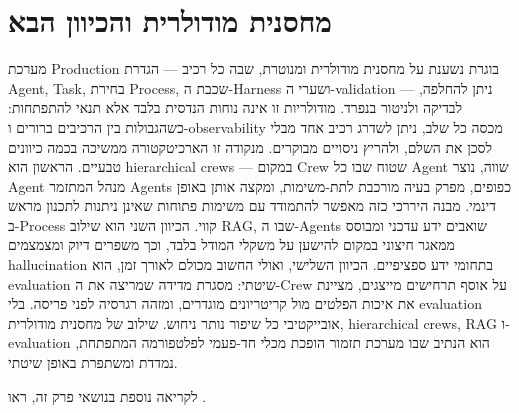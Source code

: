 \section{מחסנית מודולרית והכיוון הבא}
מערכת Production בוגרת נשענת על מחסנית מודולרית ומנוטרת, שבה כל רכיב — הגדרת Agent, Task, בחירת Process, שכבת ה-Harness ושערי ה-validation — ניתן להחלפה, לבדיקה ולניטור בנפרד. מודולריות זו אינה נוחות הנדסית בלבד אלא תנאי להתפתחות: כשהגבולות בין הרכיבים ברורים ו-observability מכסה כל שלב, ניתן לשדרג רכיב אחד מבלי לסכן את השלם, ולהריץ ניסויים מבוקרים. מנקודה זו הארכיטקטורה ממשיכה בכמה כיוונים טבעיים. הראשון הוא hierarchical crews — במקום Crew שטוח שבו כל Agent שווה, נוצר Agent מנהל המתזמר Agents כפופים, מפרק בעיה מורכבת לתת-משימות, ומקצה אותן באופן דינמי. מבנה היררכי כזה מאפשר להתמודד עם משימות פתוחות שאינן ניתנות לתכנון מראש ב-Process קווי. הכיוון השני הוא שילוב RAG, שבו ה-Agents שואבים ידע עדכני ומבוסס ממאגר חיצוני במקום להישען על משקלי המודל בלבד, וכך משפרים דיוק ומצמצמים hallucination בתחומי ידע ספציפיים. הכיוון השלישי, ואולי החשוב מכולם לאורך זמן, הוא evaluation שיטתי: מסגרת מדידה שמריצה את ה-Crew על אוסף תרחישים מייצגים, מציינת את איכות הפלטים מול קריטריונים מוגדרים, ומזהה רגרסיה לפני פריסה. בלי evaluation אובייקטיבי כל שיפור נותר ניחוש. שילוב של מחסנית מודולרית, hierarchical crews, RAG ו-evaluation הוא הנתיב שבו מערכת תזמור הופכת מכלי חד-פעמי לפלטפורמה המתפתחת, נמדדת ומשתפרת באופן שיטתי.

לקריאה נוספת בנושאי פרק זה, ראו \cite{latex_project}.

